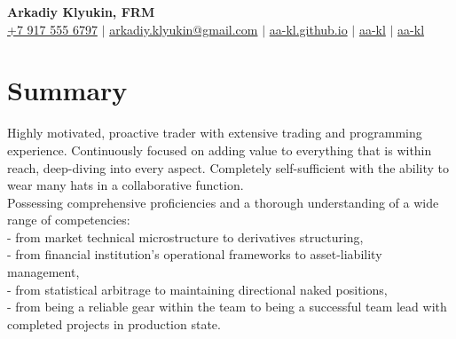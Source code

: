 \documentclass[a4paper,hidelinks]{article}
\begin{document}

\begin{center}
  \hspace{2cm}\textbf{\Huge{Arkadiy Klyukin, FRM}} \\ \vspace{0pt}
  \small
  \faMobile \hspace{.5pt} \href{tel:+79175556797}{+7 917 555 6797}
  $|$
  \faAt \hspace{.5pt} \href{mailto:arkadiy.klyukin@gmail.com}{arkadiy.klyukin@gmail.com}
  $|$
  \faGlobe \hspace{.5pt} \href{https://aa-kl.github.io}{aa-kl.github.io}
  $|$
  \faLinkedinSquare \hspace{.5pt} \href{https://www.linkedin.com/in/aa-kl}{aa-kl}
  $|$
  \faGithub \hspace{.5pt} \href{https://github.com/aa-kl}{aa-kl}
\end{center}

\vspace{-15pt}
\section{Summary}
Highly motivated, proactive trader with extensive trading and programming experience. Continuously focused on adding value to everything that is within reach, deep-diving into every aspect. Completely self-sufficient with the ability to wear many hats in a collaborative function.\\
Possessing comprehensive proficiencies and a thorough understanding of a wide range of competencies:\\
- from market technical microstructure to derivatives structuring,\\
- from financial institution's operational frameworks to asset-liability management,\\
- from statistical arbitrage to maintaining directional naked positions,\\
- from being a reliable gear within the team to being a successful team lead with completed projects in production state.\\

\vspace{-3pt}
\end{document}
